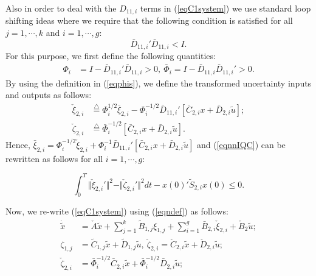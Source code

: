 \documentclass[twocolumn]{autart}
\newcommand{\eqdef}{\stackrel{\triangle}{=}}
\begin{document}
\noindent Also in order to deal with the $D_{11,i}$ terms in (\ref{eqC1system}) we use  standard loop shifting ideas \cite{outputfeedback_petersen,Basar_book} where we require that the following condition is satisfied for all $j=1,\cdots, k$ and $i=1,\cdots,g$: 
\begin{equation}
\label{eqcondD1}
\bar{D}_{11,i}' \bar{D}_{11,i}<I.
\end{equation}
For this purpose, we first define the following quantities:
\begin{equation}
\label{eqphis}
\begin{split}
\Phi_i&=I-\bar{D}_{11,i}' \bar{D}_{11,i}>0,~\bar{\Phi}_i=I-\bar{D}_{11,i} \bar{D}_{11,i}'>0.
\end{split}
\end{equation}
By using the definition in (\ref{eqphis}), we define the transformed uncertainty inputs and outputs as follows:
\begin{equation}
\label{eqndef}
\begin{split}
\check{\xi}_{2,i} &\eqdef \Phi_i^{1/2}\bar{\xi}_{2,i}-\Phi_i^{-1/2} \bar{D}_{11,i}'[\bar{C}_{2,i} x +\bar{D}_{2,i}\tilde{u}];\\
\check{\zeta}_{2,i} &\eqdef \bar{\Phi}_i^{-1/2} [\bar{C}_{2,i} x +\bar{D}_{2,i}\tilde{u}].
\end{split}
\end{equation}
Hence, $\bar{\xi}_{2,i}=\Phi_i^{-1/2}\check{\xi}_{2,i}+\Phi_i^{-1} \bar{D}_{11,i}'[\bar{C}_{2,i} x +\bar{D}_{2,i}\tilde{u}]$
and (\ref{eqnnIQC}) can be rewritten as follows for all $i=1,\cdots,g$:
\begin{small}
\begin{equation}
\label{eqfIQC}
\int_0^T\Vert\check{\xi}_{2,i}'\Vert^2- \Vert \check{\zeta}_{2,i}'\Vert^2 dt -x(0)'\tilde{S}_{2,i}x(0)\leq0.
\end{equation}
\end{small} 
Now, we re-write (\ref{eqC1system}) using (\ref{eqndef}) as follows:
\begin{equation}
\label{eqC2system}
\begin{split}
\dot{\tilde{x}}&=\check{A} \tilde{x}+ \sum_{j=1}^k \tilde{B}_{1,j} {\xi}_{1,j}+ \sum_{i=1}^g \bar{B}_{2,i} \check{\xi}_{2,i}+\check{B}_{2}\tilde{u} ;\\
{\zeta}_{1,j}&=\tilde{C}_{1,j}  \tilde{x}+\tilde{D}_{1,j} \tilde{u},~\check{\zeta}_{2,i}=\check{C}_{2,i}  \tilde{x}+\check{D}_{2,i} \tilde{u};\\
\check{\zeta}_{2,i}&=\bar{\Phi}_i^{-1/2}\bar{C}_{2,i}\tilde{x}+\bar{\Phi}_i^{-1/2}\bar{D}_{2,i}\tilde{u};
\end{split}
\end{equation}
\end{document}
